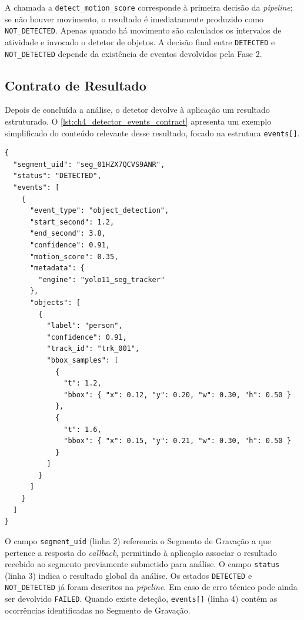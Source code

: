 A chamada a \texttt{detect\_motion\_score} corresponde à primeira decisão da \textit{pipeline}; se não houver movimento, o resultado é imediatamente produzido como \texttt{NOT\_DETECTED}. Apenas quando há movimento são calculados os intervalos de atividade e invocado o detetor de objetos. A decisão final entre \texttt{DETECTED} e \texttt{NOT\_DETECTED} depende da existência de eventos devolvidos pela Fase 2.

\subsection{Contrato de Resultado}

Depois de concluída a análise, o detetor devolve à aplicação um resultado estruturado. O \autoref{lst:ch4_detector_events_contract} apresenta um exemplo simplificado do conteúdo relevante desse resultado, focado na estrutura \texttt{events[]}.

\par\noindent\begin{minipage}{\linewidth}
\begin{lstlisting}[caption={Exemplo simplificado da estrutura de eventos devolvida pelo detetor (json)},label={lst:ch4_detector_events_contract}]
{
  "segment_uid": "seg_01HZX7QCVS9ANR",
  "status": "DETECTED",
  "events": [
    {
      "event_type": "object_detection",
      "start_second": 1.2,
      "end_second": 3.8,
      "confidence": 0.91,
      "motion_score": 0.35,
      "metadata": {
        "engine": "yolo11_seg_tracker"
      },
      "objects": [
        {
          "label": "person",
          "confidence": 0.91,
          "track_id": "trk_001",
          "bbox_samples": [
            {
              "t": 1.2,
              "bbox": { "x": 0.12, "y": 0.20, "w": 0.30, "h": 0.50 }
            },
            {
              "t": 1.6,
              "bbox": { "x": 0.15, "y": 0.21, "w": 0.30, "h": 0.50 }
            }
          ]
        }
      ]
    }
  ]
}
\end{lstlisting}
\end{minipage}

O campo \texttt{segment\_uid} (linha 2) referencia o Segmento de Gravação a que pertence a resposta do \textit{callback}, permitindo à aplicação associar o resultado recebido ao segmento previamente submetido para análise. O campo \texttt{status} (linha 3) indica o resultado global da análise. Os estados \texttt{DETECTED} e \texttt{NOT\_DETECTED} já foram descritos na \textit{pipeline}. Em caso de erro técnico pode ainda ser devolvido \texttt{FAILED}. Quando existe deteção, \texttt{events[]} (linha 4) contém as ocorrências identificadas no Segmento de Gravação.

